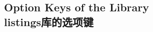 \subsection{Option Keys of the  Library\\listings库的选项键}\label{sec:speclistingkeys}

% 
% 
% 
% 
% 
% 


